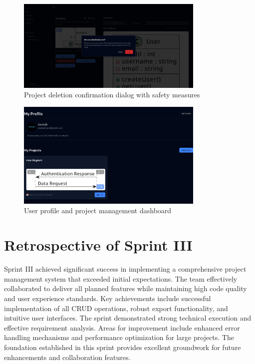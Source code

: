 \begin{figure}[H]
\centering
\includegraphics[width=0.8\textwidth]{screenshots/delate.png}
\caption{Project deletion confirmation dialog with safety measures}
\label{fig:delete_confirmation}
\end{figure}

\begin{figure}[H]
\centering
\includegraphics[width=0.8\textwidth]{screenshots/me.png}
\caption{User profile and project management dashboard}
\label{fig:user_profile}
\end{figure}

\section{Retrospective of Sprint III}

Sprint III achieved significant success in implementing a comprehensive project management system that exceeded initial expectations. The team effectively collaborated to deliver all planned features while maintaining high code quality and user experience standards. Key achievements include successful implementation of all CRUD operations, robust export functionality, and intuitive user interfaces. The sprint demonstrated strong technical execution and effective requirement analysis. Areas for improvement include enhanced error handling mechanisms and performance optimization for large projects. The foundation established in this sprint provides excellent groundwork for future enhancements and collaboration features.

